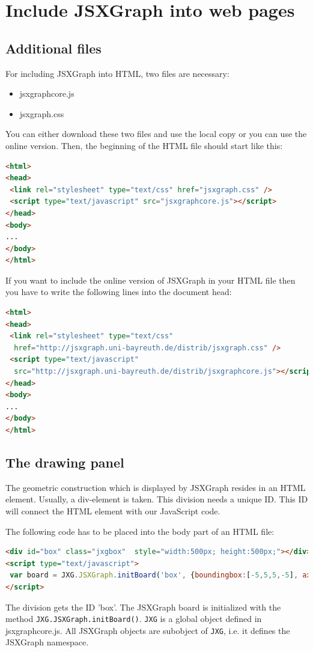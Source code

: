 \chapter{Include JSXGraph into web pages}\label{ch:start}

\section{Additional files}
For including JSXGraph into HTML, two files are necessary:
\begin{itemize}
    \item jsxgraphcore.js
    \item jsxgraph.css
\end{itemize}
You can either download these two files and use the local copy or you can use the online version.
Then, the beginning of the HTML file should start like this:
\begin{fullwidth}\begin{lstlisting}[language=HTML]
<html>
<head>
 <link rel="stylesheet" type="text/css" href="jsxgraph.css" />
 <script type="text/javascript" src="jsxgraphcore.js"></script>
</head>
<body>
...
</body>
</html>
\end{lstlisting}\end{fullwidth}
If you want to include the online version of JSXGraph in your HTML file then you have to write the following lines into the document head:
\begin{fullwidth}\begin{lstlisting}[language=HTML]
<html>
<head>
 <link rel="stylesheet" type="text/css" 
  href="http://jsxgraph.uni-bayreuth.de/distrib/jsxgraph.css" />
 <script type="text/javascript" 
  src="http://jsxgraph.uni-bayreuth.de/distrib/jsxgraphcore.js"></script>
</head>
<body>
...
</body>
</html>
\end{lstlisting}\end{fullwidth}

\section{The drawing panel}

The geometric construction which is displayed by JSXGraph resides in an HTML element. Usually, a div-element is taken. This division needs a unique ID. This ID will connect the HTML element with our JavaScript code.

The following code has to be placed into the body part of an HTML file:
\begin{fullwidth}\begin{lstlisting}[language=HTML]
<div id="box" class="jxgbox"  style="width:500px; height:500px;"></div>
<script type="text/javascript"> 
 var board = JXG.JSXGraph.initBoard('box', {boundingbox:[-5,5,5,-5], axis:true});
</script>
\end{lstlisting}\end{fullwidth}
The division gets the ID 'box'. The JSXGraph board is initialized with the method
\lstinline|JXG.JSXGraph.initBoard()|. \lstinline|JXG| is a global object defined in jsxgraphcore.js. All JSXGraph objects
are subobject of \lstinline|JXG|, i.e. it defines the JSXGraph namespace.

